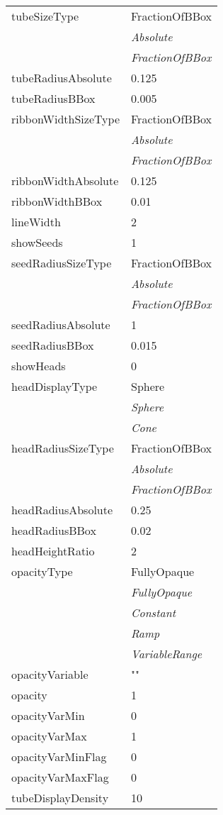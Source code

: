 \documentclass[10pt,a4paper]{report}
\begin{document}
\begin{longtable}{ll}
tubeSizeType  &  FractionOfBBox   \\
 & {\it  Absolute} \\
 & {\it  FractionOfBBox} \\
tubeRadiusAbsolute  &  0.125 \\
tubeRadiusBBox  &  0.005 \\
ribbonWidthSizeType  &  FractionOfBBox   \\
 & {\it  Absolute} \\
 & {\it  FractionOfBBox} \\
ribbonWidthAbsolute  &  0.125 \\
ribbonWidthBBox  &  0.01 \\
lineWidth  &  2 \\
showSeeds  &  1 \\
seedRadiusSizeType  &  FractionOfBBox   \\
 & {\it  Absolute} \\
 & {\it  FractionOfBBox} \\
seedRadiusAbsolute  &  1 \\
seedRadiusBBox  &  0.015 \\
showHeads  &  0 \\
headDisplayType  &  Sphere   \\
 & {\it  Sphere} \\
 & {\it  Cone} \\
headRadiusSizeType  &  FractionOfBBox   \\
 & {\it  Absolute} \\
 & {\it  FractionOfBBox} \\
headRadiusAbsolute  &  0.25 \\
headRadiusBBox  &  0.02 \\
headHeightRatio  &  2 \\
opacityType  &  FullyOpaque   \\
 & {\it  FullyOpaque} \\
 & {\it  Constant} \\
 & {\it  Ramp} \\
 & {\it  VariableRange} \\
opacityVariable  &  "" \\
opacity  &  1 \\
opacityVarMin  &  0 \\
opacityVarMax  &  1 \\
opacityVarMinFlag  &  0 \\
opacityVarMaxFlag  &  0 \\
tubeDisplayDensity  &  10 \\

\end{longtable}
\end{document}

